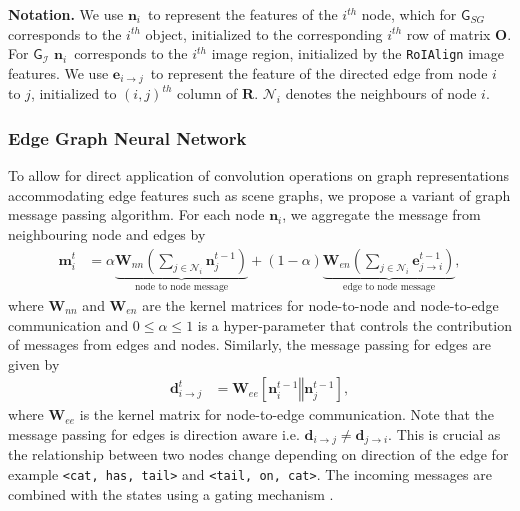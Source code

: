 \documentclass[final]{cvpr}
\newcommand{\imagerep}{\mathcal{I}}
\newcommand{\objectlabelrepeq}{\mathbf{O}}
\newcommand{\relationlabelrepeq}{\mathbf{R}}
\newcommand{\noderep}{$\mathbf{n}_{i}$}
\newcommand{\edgerep}{$\mathbf{e}_{i \rightarrow j}$}
\newcommand{\imagegrapheq}{\mathsf{G}_{\imagerep}}
\newcommand{\scenegrapheq}{\mathsf{G}_{SG}}
\begin{document}
\vspace{0.08in}
\noindent
\textbf{Notation.} 
We use \noderep~to represent the features of the $i^{th}$ node, which for $\scenegrapheq$ corresponds to the $i^{th}$ object, initialized to the  corresponding $i^{th}$ row of matrix $\objectlabelrepeq$. For $\imagegrapheq$  \noderep~corresponds to the $i^{th}$ image region, initialized by the {\tt RoIAlign} image features. 
We use \edgerep~to represent the feature of the directed edge from node $i$ to $j$, initialized to $(i,j)^{th}$ column of $\relationlabelrepeq$. $\mathcal{N}_{i}$ denotes the neighbours of node ${i}$. 
\subsubsection{Edge Graph Neural Network}
To allow for direct application of convolution operations on graph representations accommodating edge features such as scene graphs, we propose a variant of graph message passing algorithm. For each node \noderep, we aggregate the message from neighbouring node and edges by
\begin{align}
    \mathbf{m}_{i}^{t} &= \alpha \underbrace{\mathbf{W}_{nn} \left( \sum_{j \in \mathcal{N}_{i}} \mathbf{n}_{j}^{t-1} \right)}_\text{node to node message} + (1-\alpha) \underbrace{\mathbf{W}_{en} \left( \sum_{j \in \mathcal{N}_{i}} \mathbf{e}_{j \rightarrow i}^{t-1} \right)}_\text{edge to node message}, \label{eq:acc_attn}
\end{align}
where $\mathbf{W}_{nn}$ and $\mathbf{W}_{en}$ are the kernel matrices for node-to-node and node-to-edge communication and $0 \le \alpha \le 1$ is a hyper-parameter that controls the contribution of messages from edges and nodes.
Similarly, the message passing for edges are given by
\begin{align}
    \mathbf{d}_{i \rightarrow j}^{t} &= \mathbf{W}_{ee}[\mathbf{n}_{i}^{t-1} \mathbin\Vert \mathbf{n}_{j}^{t-1}],  \label{eq:edge_acc}
\end{align}
where $\mathbf{W}_{ee}$ is the kernel matrix for node-to-edge communication. Note that the message passing for edges is direction aware i.e. $\mathbf{d}_{i \rightarrow j} \neq \mathbf{d}_{j \rightarrow i}$. This is crucial as the relationship between two nodes change depending on direction of the edge for example \texttt{<cat, has, tail>} and \texttt{<tail, on, cat>}.
The incoming messages are combined with the states using a gating mechanism \cite{DBLP:journals/corr/LiTBZ15}.
\end{document}
